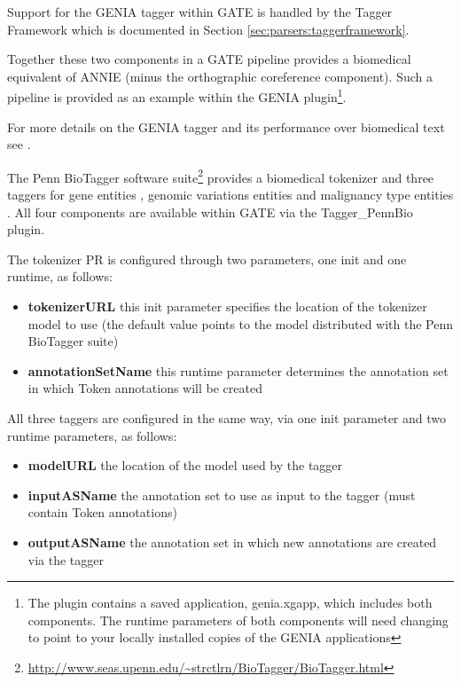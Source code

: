 Support for the GENIA tagger within GATE is handled by the Tagger Framework which is documented in
Section \ref{sec:parsers:taggerframework}.

Together these two components in a GATE pipeline provides a biomedical
equivalent of ANNIE (minus the orthographic coreference component). Such a pipeline
is provided as an example within the GENIA plugin\footnote{The plugin contains a saved
application, genia.xgapp, which includes both components. The runtime parameters of both
components will need changing to point to your locally installed copies of the GENIA applications}.

For more details on the GENIA tagger and its performance over biomedical text see \cite{Tsuruoka05}.



The Penn BioTagger software suite\footnote{\url{http://www.seas.upenn.edu/~strctlrn/BioTagger/BioTagger.html}}
provides a biomedical tokenizer and three taggers for gene entities \cite{McDonald05}, genomic variations
entities \cite{McDonald04} and malignancy type entities \cite{Jin06}. All four components are available
within GATE via the Tagger\_PennBio plugin.

The tokenizer PR is configured through two parameters, one init and one runtime, as follows:
\begin{itemize}
\item \textbf{tokenizerURL} this init parameter specifies the location of the tokenizer model to use
  (the default value points to the model distributed with the Penn BioTagger suite)
\item \textbf{annotationSetName} this runtime parameter determines the annotation set in which Token
  annotations will be created
\end{itemize}

All three taggers are configured in the same way, via one init parameter and two runtime parameters, as follows:
\begin{itemize}
\item \textbf{modelURL} the location of the model used by the tagger
\item \textbf{inputASName} the annotation set to use as input to the tagger (must contain Token annotations)
\item \textbf{outputASName} the annotation set in which new annotations are created via the tagger
\end{itemize}


